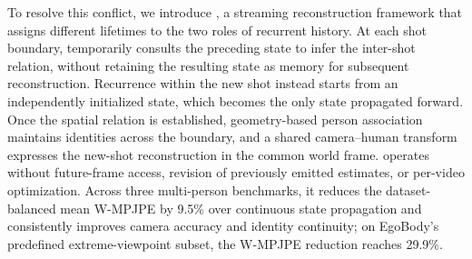 To resolve this conflict, we introduce \method{}, a streaming reconstruction
framework that assigns different lifetimes to the two roles of recurrent
history. At each shot boundary, \method{} temporarily consults the preceding
state to infer the inter-shot relation, without retaining the resulting state
as memory for subsequent reconstruction. Recurrence within the new shot
instead starts from an independently initialized state, which becomes the only
state propagated forward. Once the spatial relation is established,
geometry-based person association maintains identities across the boundary,
and a shared camera--human transform expresses the new-shot reconstruction in
the common world frame. \method{} operates without future-frame access,
revision of previously emitted estimates, or per-video optimization. Across
three multi-person benchmarks, it reduces the dataset-balanced mean W-MPJPE by
9.5\% over continuous state propagation and consistently improves camera
accuracy and identity continuity; on EgoBody's predefined extreme-viewpoint
subset, the W-MPJPE reduction reaches 29.9\%.

